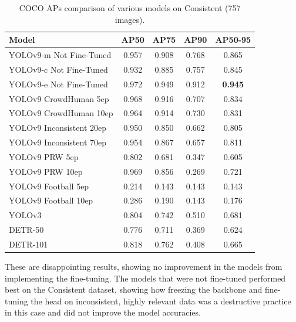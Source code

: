 \begin{table}[H]
    \centering
    \renewcommand{\arraystretch}{1.5}
    \setlength{\tabcolsep}{1em}
    \begin{tabular}{|l|c|c|c|c|}
        \hline
        \rowcolor{gray!25}
        \textbf{Model} & \textbf{AP50} & \textbf{AP75} & \textbf{AP90} & \textbf{AP50-95} \\ \hline
        YOLOv9-m Not Fine-Tuned         & 0.957 & 0.908 & 0.768 & 0.865 \\ \hline
        YOLOv9-c Not Fine-Tuned         & 0.932 & 0.885 & 0.757 & 0.845 \\ \hline
        YOLOv9-e Not Fine-Tuned         & 0.972 & 0.949 & 0.912 & \textbf{0.945 }\\ \hline
        YOLOv9 CrowdHuman 5ep           & 0.968 & 0.916 & 0.707 & 0.834 \\ \hline
        YOLOv9 CrowdHuman 10ep          & 0.964 & 0.914 & 0.730 & 0.831 \\ \hline
        YOLOv9 Inconsistent 20ep        & 0.950 & 0.850 & 0.662 & 0.805 \\ \hline
        YOLOv9 Inconsistent 70ep        & 0.954 & 0.867 & 0.657 & 0.811 \\ \hline
        YOLOv9 PRW 5ep                  & 0.802 & 0.681 & 0.347 & 0.605 \\ \hline
        YOLOv9 PRW 10ep                 & 0.969 & 0.856 & 0.269 & 0.721 \\ \hline
        YOLOv9 Football 5ep             & 0.214 & 0.143 & 0.143 & 0.143 \\ \hline
        YOLOv9 Football 10ep            & 0.286 & 0.190 & 0.143 & 0.176 \\ \hline
        YOLOv3                          & 0.804 & 0.742 & 0.510 & 0.681 \\ \hline
        DETR-50                         & 0.776 & 0.711 & 0.369 & 0.624 \\ \hline
        DETR-101                        & 0.818 & 0.762 & 0.408 & 0.665 \\ \hline
\end{tabular}
\caption[COCO APs Comparison of Various Models on Consistent.]{COCO APs comparison of various models on Consistent (757 images).}
\label{tab:APs_models_COCO}
\end{table}

\label{sec:table_discussion}
These are disappointing results, showing no improvement in the models from implementing the fine-tuning. The models that were not fine-tuned performed best on the Consistent dataset, showing how freezing the backbone and fine-tuning the head on inconsistent, highly relevant data was a destructive practice in this case and did not improve the model accuracies. 

